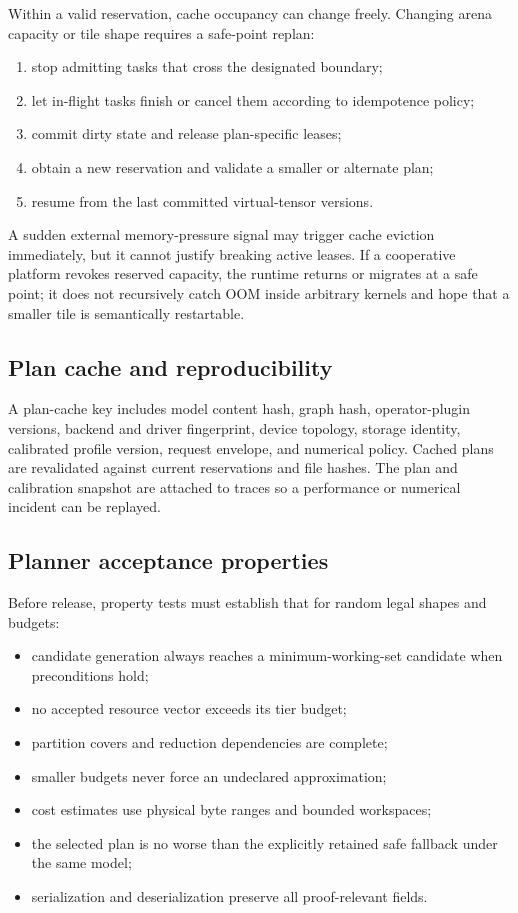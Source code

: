 Within a valid reservation, cache occupancy can change freely. Changing arena capacity or tile shape requires a safe-point replan:

\begin{enumerate}
  \item stop admitting tasks that cross the designated boundary;
  \item let in-flight tasks finish or cancel them according to idempotence policy;
  \item commit dirty state and release plan-specific leases;
  \item obtain a new reservation and validate a smaller or alternate plan;
  \item resume from the last committed virtual-tensor versions.
\end{enumerate}

A sudden external memory-pressure signal may trigger cache eviction immediately, but it cannot justify breaking active leases. If a cooperative platform revokes reserved capacity, the runtime returns  or migrates at a safe point; it does not recursively catch OOM inside arbitrary kernels and hope that a smaller tile is semantically restartable.

\subsection{Plan cache and reproducibility}

A plan-cache key includes model content hash, graph hash, operator-plugin versions, backend and driver fingerprint, device topology, storage identity, calibrated profile version, request envelope, and numerical policy. Cached plans are revalidated against current reservations and file hashes. The plan and calibration snapshot are attached to traces so a performance or numerical incident can be replayed.

\subsection{Planner acceptance properties}

Before release, property tests must establish that for random legal shapes and budgets:

\begin{itemize}
  \item candidate generation always reaches a minimum-working-set candidate when preconditions hold;
  \item no accepted resource vector exceeds its tier budget;
  \item partition covers and reduction dependencies are complete;
  \item smaller budgets never force an undeclared approximation;
  \item cost estimates use physical byte ranges and bounded workspaces;
  \item the selected plan is no worse than the explicitly retained safe fallback under the same model;
  \item serialization and deserialization preserve all proof-relevant fields.
\end{itemize}
